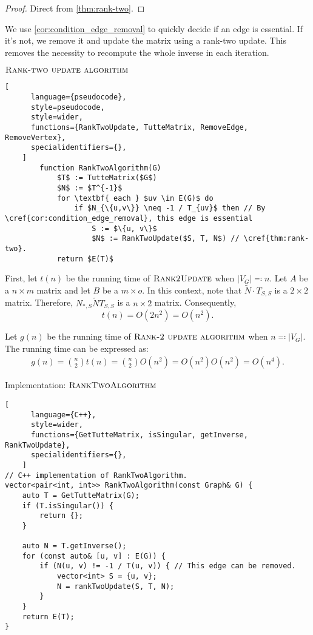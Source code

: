\begin{proof}
    Direct from \cref{thm:rank-two}. 
\end{proof}

We use \cref{cor:condition_edge_removal} to quickly decide if an edge is essential. 
If it's not, we remove it and update the matrix using a rank-two update. 
This removes the necessity to recompute the whole inverse in each iteration.

\newpage
\begin{programruledcaption}{\(\textsc{Rank-two update algorithm}\)}
  \label{alg:rank-two}
    \begin{lstlisting}[
      language={pseudocode},
      style=pseudocode,
      style=wider,
      functions={RankTwoUpdate, TutteMatrix, RemoveEdge, RemoveVertex},
      specialidentifiers={},
    ]
        function RankTwoAlgorithm(G)
            $T$ := TutteMatrix($G$)
            $N$ := $T^{-1}$
            for \textbf{ each } $uv \in E(G)$ do
                if $N_{\{u,v\}} \neq -1 / T_{uv}$ then // By \cref{cor:condition_edge_removal}, this edge is essential
                    S := $\{u, v\}$
                    $N$ := RankTwoUpdate($S, T, N$) // \cref{thm:rank-two}.
            return $E(T)$
    \end{lstlisting}
\end{programruledcaption}

First, let \(t(n)\) be the running time of \(\textsc{Rank2Update}\) when \(|V_G| \eqcolon n\).
Let \(A\) be a \(n \times m\) matrix and let \(B\) be a \(m \times o\).
In this context, note that \(\tilde{N} \cdot T_{S, S}\) is a \(2 \times 2\) matrix.
Therefore, \(N_{*, S}\tilde{N}T_{S, S}\) is a \(n \times 2\) matrix.
Consequently,
\[
    t(n) = O(2n^2) = O(n^2).
\]

Let \(g(n)\) be the running time of \(\textsc{Rank-2 update algorithm}\) when \(n \eqcolon |V_G|\).
The running time can be expressed as:
\begin{align*}
    g(n) = \binom{n}{2} t(n) = \binom{n}{2} O(n^2) = O(n^2) O(n^2) = O(n^4).
\end{align*}

\begin{programruledcaption}{Implementation: \(\textsc{RankTwoAlgorithm}\)}
    \begin{lstlisting}[
      language={C++},
      style=wider,
      functions={GetTutteMatrix, isSingular, getInverse, RankTwoUpdate},
      specialidentifiers={},
    ]
// C++ implementation of RankTwoAlgorithm.
vector<pair<int, int>> RankTwoAlgorithm(const Graph& G) {
    auto T = GetTutteMatrix(G);
    if (T.isSingular()) {
        return {};
    } 

    auto N = T.getInverse();
    for (const auto& [u, v] : E(G)) {
        if (N(u, v) != -1 / T(u, v)) { // This edge can be removed.
            vector<int> S = {u, v};
            N = rankTwoUpdate(S, T, N);
        }
    }
    return E(T);
}
    \end{lstlisting}
\end{programruledcaption}
